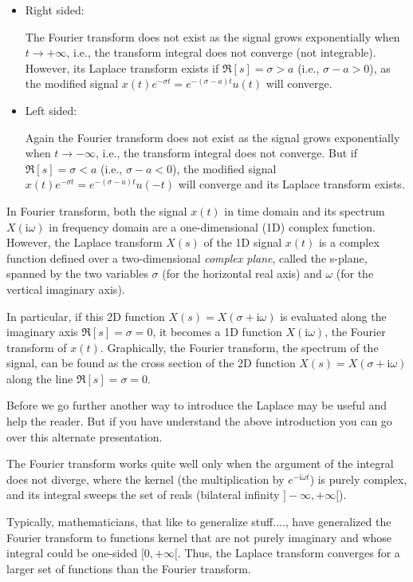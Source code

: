 	\begin{itemize}
		\item Right sided:
		
		The Fourier transform does not exist as the signal grows exponentially when $t\rightarrow +\infty$, i.e., the transform integral does not converge (not integrable). However, its Laplace transform exists if $\Re[s]=\sigma>a$ (i.e., $\sigma-a>0$), as the modified signal $x(t)e^{-\sigma t}=e^{-(\sigma-a)t}u(t)$ will converge.
		
		\item Left sided:
		 
		Again the Fourier transform does not exist as the signal grows exponentially when $t\rightarrow -\infty$, i.e., the transform integral does not converge. But if $\Re[s]=\sigma<a$ (i.e., $\sigma-a<0$), the modified signal $x(t)e^{-\sigma t}=e^{-(\sigma-a)t}u(-t)$ will converge and its Laplace transform exists.
	\end{itemize}

	In Fourier transform, both the signal $x(t)$ in time domain and its spectrum $X(\mathrm{i}\omega)$ in frequency domain are a one-dimensional (1D) complex function. However, the Laplace transform $X(s)$ of the 1D signal $x(t)$ is a complex function defined over a two-dimensional {\em complex plane}, called the s-plane,	spanned by the two variables $\sigma$ (for the horizontal real axis) and $\omega$ (for the vertical imaginary axis). 
	
	In particular, if this 2D function $X(s)=X(\sigma+\mathrm{i}\omega)$ is evaluated along the imaginary axis $\Re[s]=\sigma=0$, it becomes a 1D function $X(\mathrm{i}\omega)$, the	Fourier transform of $x(t)$. Graphically, the Fourier transform, the spectrum of the signal, can be found as the cross section of the 2D function $X(s)=X(\sigma+\mathrm{i}\omega)$ along the line $\Re[s]=\sigma=0$.
	
	Before we go further another way to introduce the Laplace may be useful and help the reader. But if you have understand the above introduction you can go over this alternate presentation.
	
	The Fourier transform works quite well only when the argument of the integral does not diverge, where the kernel (the multiplication by $e^{-\mathrm{i}\omega t}$) is purely complex, and its integral sweeps the set of reals (bilateral infinity $]-\infty,+\infty[$).

	Typically, mathematicians, that like to generalize stuff...., have generalized the Fourier transform to functions kernel that are not purely imaginary and whose integral could be one-sided $[0,+\infty[$. Thus, the Laplace transform converges for a larger set of functions than the Fourier transform.
	
